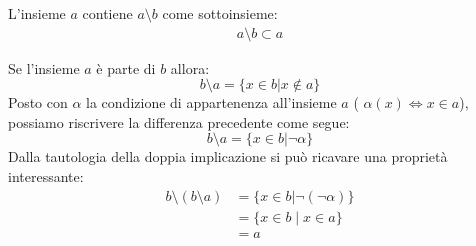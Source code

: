 \begin{center}
	\def\firstcircle{(0,0) circle (1.5cm)}
	\def\secondcircle{(0:2cm) circle (1.5cm)}
	\setlength{\parskip}{5mm}
\begin{minipage}{.45\textwidth}
	\centering
\end{minipage}
\begin{minipage}{.45\textwidth}
	\centering
\end{minipage}
\end{center}
\begin{osservation}
	L'insieme $a$ contiene $a \setminus b$ come sottoinsieme:
	\begin{align*}
		a \setminus b \subset a
	\end{align*}

	Se l'insieme $a$ è parte di $b$ allora:	$$b \setminus a = \{x \in b | x \notin a\}$$
	Posto con $\alpha$ la condizione di appartenenza all'insieme $a$ (  $\alpha(x) \iff x \in a$), possiamo riscrivere la differenza precedente come segue: $$b \setminus a = \{x \in b | \neg \alpha \}$$	
Dalla tautologia della doppia implicazione si può ricavare una proprietà interessante:
\begin{align}\label{differenza_prop1}
	b \setminus (b \setminus a) &= \{x \in b | \neg (\neg \alpha)\} \nonumber \\
	&= \{x \in b \; | \; x \in a\} \nonumber \\
	&= a
\end{align}
\end{osservation}
